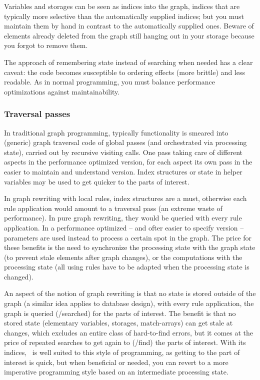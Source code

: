 Variables and storages can be seen as indices into the graph, indices that are typically more selective than the automatically supplied indices; 
but you must maintain them by hand in contrast to the automatically supplied ones.
Beware of elements already deleted from the graph still hanging out in your storage because you forgot to remove them.

The approach of remembering state instead of searching when needed has a clear caveat: the code becomes susceptible to ordering effects (more brittle) and less readable. 
As in normal programming, you must balance performance optimizations against maintainability.

\subsubsection*{Traversal passes}

In traditional graph programming, 
typically functionality is smeared into (generic) graph traversal code of global passes (and orchestrated via processing state), carried out by recursive visiting calls.
One pass taking care of different aspects in the performance optimized version,
for each aspect its own pass in the easier to maintain and understand version.
Index structures or state in helper variables may be used to get quicker to the parts of interest.

In graph rewriting with local rules, index structures are a must, otherwise each rule application would amount to a traversal pass (an extreme waste of performance).
In pure graph rewriting, they would be queried with every rule application.
In a performance optimized -- and ofter easier to specify version -- parameters are used instead to process a certain spot in the graph.
The price for these benefits is the need to synchronize the processing state with the graph state (to prevent stale elements after graph changes), or the computations with the processing state (all using rules have to be adapted when the processing state is changed).

\begin{note}
An aspect of the notion of graph rewriting is that no state is stored outside of the graph (a similar idea applies to database design), 
with every rule application, the graph is queried (/searched) for the parts of interest.
The benefit is that no stored state (elementary variables, storages, match-arrays) can get stale at changes,
which excludes an entire class of hard-to-find errors,
but it comes at the price of repeated searches to get again to (/find) the parts of interest.
With its indices, \GrG~is well suited to this style of programming, as getting to the part of interest is quick, but when beneficial or needed, you can revert to a more imperative programming style based on an intermediate processing state.
\end{note}

